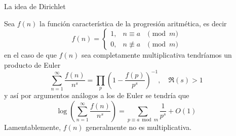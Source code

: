 \documentclass[final]{beamer}
\newlength{\sepwidth}
\newlength{\colwidth}
\newcommand{\separatorcolumn}{\begin{column}{\sepwidth}\end{column}}
\begin{document}
\begin{frame}[t,fragile]
\begin{columns}[t]
\begin{column}{\colwidth}
\begin{alertblock}{La idea de Dirichlet}

Sea $f(n)$ la función característica de la progresión aritmética, es decir
$$
f(n)=\left\{\begin{array}{lll}
1, & n \equiv a & \pmod{m} \\
0, & n \not \equiv a & \pmod{m}
\end{array}\right.
$$
en el caso de que $f(n)$ sea completamente multiplicativa tendríamos un producto de Euler
$$
\sum_{n=1}^{\infty} \frac{f(n)}{n^s}=\prod_p\left(1-\frac{f(p)}{p^s}\right)^{-1}, \quad \Re(s)>1
$$
y así por argumentos análogos a los de Euler se tendría que
$$\log \left(\sum_{n=1}^{\infty} \frac{f(n)}{n^s}\right)=\sum_{p \equiv a\bmod{m}} \frac{1}{p^s}+O(1)$$
Lamentablemente, $f(n)$ generalmente no es multiplicativa.\\
  \end{alertblock}

\end{column}

\separatorcolumn


\end{columns}
\end{frame}
\end{document}
